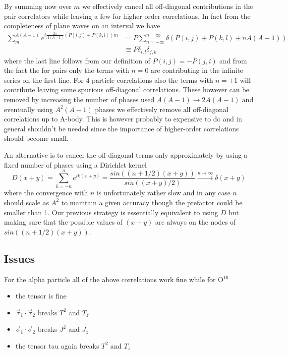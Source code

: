 \documentclass[a4paper]{article}
\begin{document}
By summing now over $m$ we effectively cancel all off-diagonal contributions in the pair correlators while leaving a few for higher order correlations. In fact from the completeness of plane waves on an interval we have
\begin{equation}
\begin{split}
\sum_m^{A(A-1)}e^{i\frac{2\pi}{A(A-1)}\left(P(i,j)+P(k,l)\right)m} &= P\sum_{n=-\infty}^{n=\infty}\delta\left(P(i,j)+P(k,l)+nA(A-1)\right)\\
&\equiv P\delta_{i,l}\delta_{j,k}
\end{split}
\end{equation}
where the last line follows from our definition of $P(i,j)=-P(j,i)$ and from the fact the for pairs only the terms with $n=0$ are contributing in the infinite series on the first line.
For $4$ particle correlations also the terms with $n=\pm1$ will contribute leaving some spurious off-diagonal correlations. These however can be removed by increasing the number of phases used $A(A-1)\to 2A(A-1)$ and eventually using $A^2(A-1)$ phases we effectively remove all off-diagonal correlations up to A-body. This is however probably to expensive to do and in general shouldn't be needed since the importance of higher-order correlations should become small.

An alternative is to cancel the off-diagonal terms only approximately by using a fixed number of phases using a Dirichlet kernel
\begin{equation}
D(x+y)=\sum_{k=-n}^n e^{ik(x+y)} = \frac{sin\left((n+1/2)(x+y)\right)}{sin\left((x+y)/2\right)}\xrightarrow{n\to\infty}\delta(x+y)
\end{equation}
where the convergence with $n$ is unfortunately rather slow and in any case $n$ should scale as $A^2$ to maintain a given accuracy though the prefactor could be smaller than 1. Our previous strategy is essentially equivalent to using $D$ but making sure that the possible values of $(x+y)$ are always on the nodes of $sin\left((n+1/2)(x+y)\right)$.

\subsection{Issues}
For the alpha particle all of the above correlations work fine while for O$^{16}$
\begin{itemize}
\item the tensor is fine
\item $\vec{\tau}_1\cdot\vec{\tau}_2$ breaks $T^2$ and $T_z$
\item $\vec{\sigma}_1\cdot\vec{\sigma}_2$ breaks $J^2$ and $J_z$
\item the tensor tau again breaks $T^2$ and $T_z$
\end{itemize}
\end{document}

